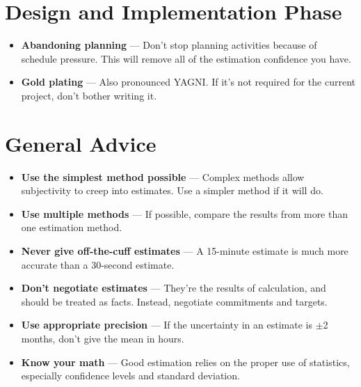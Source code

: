 \documentclass[11pt]{article}
\begin{document}
\section{Design and Implementation Phase}

\begin{itemize}
\item {\bf Abandoning planning} --- Don't stop planning activities because of schedule pressure.
  This will remove all of the estimation confidence you have.
\item {\bf Gold plating} --- Also pronounced YAGNI.  If it's not required for the current project,
  don't bother writing it.
\end{itemize}

\section{General Advice}
\begin{itemize}
\item {\bf Use the simplest method possible} --- Complex methods allow subjectivity to creep into
  estimates.  Use a simpler method if it will do.
\item {\bf Use multiple methods} --- If possible, compare the results from more than one estimation
  method.
\item {\bf Never give off-the-cuff estimates} --- A 15-minute estimate is much more accurate than a
  30-second estimate.
\item {\bf Don't negotiate estimates} --- They're the results of calculation, and should be treated
  as facts.  Instead, negotiate commitments and targets.
\item {\bf Use appropriate precision} --- If the uncertainty in an estimate is $\pm$2 months, don't
  give the mean in hours.
\item {\bf Know your math} --- Good estimation relies on the proper use of statistics, especially
  confidence levels and standard deviation.
\end{itemize}
\end{document}
